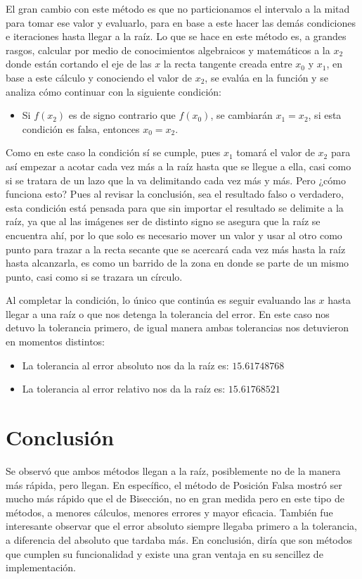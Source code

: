 \documentclass{article}
\begin{document}
El gran cambio con este método es que no particionamos el intervalo a la mitad para tomar ese valor y evaluarlo, para en base a este hacer las demás condiciones e iteraciones hasta llegar a la raíz. Lo que se hace en este método es, a grandes rasgos, calcular por medio de conocimientos algebraicos y matemáticos a la \(x_2\) donde están cortando el eje de las \(x\) la recta tangente creada entre \(x_0\) y \(x_1\), en base a este cálculo y conociendo el valor de \(x_2\), se evalúa en la función y se analiza cómo continuar con la siguiente condición:
\begin{itemize}
    \item Si \(f(x_2)\) es de signo contrario que \(f(x_0)\), se cambiarán \(x_1 = x_2\), si esta condición es falsa, entonces \(x_0 = x_2\).
\end{itemize}
Como en este caso la condición sí se cumple, pues \(x_1\) tomará el valor de \(x_2\) para así empezar a acotar cada vez más a la raíz hasta que se llegue a ella, casi como si se tratara de un lazo que la va delimitando cada vez más y más. Pero ¿cómo funciona esto?
Pues al revisar la conclusión, sea el resultado falso o verdadero, esta condición está pensada para que sin importar el resultado se delimite a la raíz, ya que al las imágenes ser de distinto signo se asegura que la raíz se encuentra ahí, por lo que solo es necesario mover un valor y usar al otro como punto para trazar a la recta secante que se acercará cada vez más hasta la raíz hasta alcanzarla, es como un barrido de la zona en donde se parte de un mismo punto, casi como si se trazara un círculo.

Al completar la condición, lo único que continúa es seguir evaluando las \(x\) hasta llegar a una raíz o que nos detenga la tolerancia del error. En este caso nos detuvo la tolerancia primero, de igual manera ambas tolerancias nos detuvieron en momentos distintos:
\begin{itemize}
    \item La tolerancia al error absoluto nos da la raíz es: \(15.61748768\)
    \item La tolerancia al error relativo nos da la raíz es: \(15.61768521\)
\end{itemize}

\section{Conclusión}
Se observó que ambos métodos llegan a la raíz, posiblemente no de la manera más rápida, pero llegan. En específico, el método de Posición Falsa mostró ser mucho más rápido que el de Bisección, no en gran medida pero en este tipo de métodos, a menores cálculos, menores errores y mayor eficacia. También fue interesante observar que el error absoluto siempre llegaba primero a la tolerancia, a diferencia del absoluto que tardaba más. En conclusión, diría que son métodos que cumplen su funcionalidad y existe una gran ventaja en su sencillez de implementación.
\end{document}
